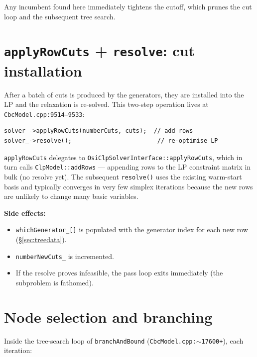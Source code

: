 \documentclass[11pt,a4paper]{article}
\begin{document}
Any incumbent found here immediately tightens the cutoff, which
prunes the cut loop and the subsequent tree search.

\section{\texttt{applyRowCuts} + \texttt{resolve}: cut installation}
\label{sec:applyresolve}

After a batch of cuts is produced by the generators, they are
installed into the LP and the relaxation is re-solved.  This
two-step operation lives at \texttt{CbcModel.cpp:9514--9533}:

\begin{lstlisting}
solver_->applyRowCuts(numberCuts, cuts);  // add rows
solver_->resolve();                        // re-optimise LP
\end{lstlisting}

\texttt{applyRowCuts} delegates to
\texttt{OsiClpSolverInterface::applyRowCuts}, which in turn calls
\texttt{ClpModel::addRows} --- appending rows to the LP constraint
matrix in bulk (no resolve yet).  The subsequent
\texttt{resolve()} uses the existing warm-start basis and typically
converges in very few simplex iterations because the new rows are
unlikely to change many basic variables.

\textbf{Side effects:}
\begin{itemize}[leftmargin=*]
  \item \texttt{whichGenerator\_[]} is populated with the
        generator index for each new row (\S\ref{sec:treedata}).
  \item \texttt{numberNewCuts\_} is incremented.
  \item If the resolve proves infeasible, the pass loop exits
        immediately (the subproblem is fathomed).
\end{itemize}

\section{Node selection and branching}
\label{sec:nodeselect}

Inside the tree-search loop of \texttt{branchAndBound}
(\texttt{CbcModel.cpp:$\sim$17600+}), each iteration:
\end{document}
